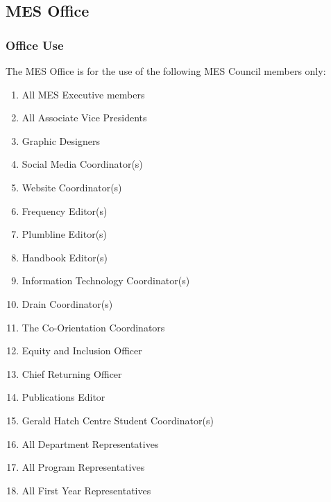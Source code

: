 \subsection{MES Office}
\label{mes-office}

\subsubsection{Office Use}
\label{office-use}

The MES Office is for the use of the following MES Council members only:

\begin{enumerate}
 \item
  All MES Executive members
 \item
  All Associate Vice Presidents
 \item
  Graphic Designers
 \item
  Social Media Coordinator(s)
 \item
  Website Coordinator(s)
 \item
  Frequency Editor(s)
 \item
  Plumbline Editor(s)
 \item
  Handbook Editor(s)
 \item
  Information Technology Coordinator(s)
 \item
  Drain Coordinator(s)
 \item
  The Co-Orientation Coordinators
 \item
  Equity and Inclusion Officer
 \item
  Chief Returning Officer
 \item
  Publications Editor
 \item
  Gerald Hatch Centre Student Coordinator(s)
 \item
  All Department Representatives
 \item
  All Program Representatives
 \item
  All First Year Representatives
\end{enumerate}

